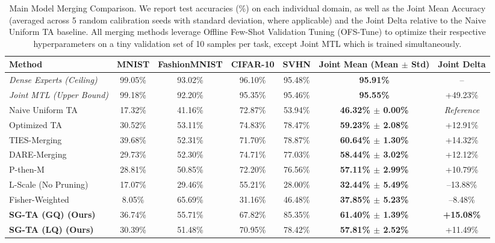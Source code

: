 \begin{table}[t]
\caption{Main Model Merging Comparison. We report test accuracies (\%) on each individual domain, as well as the Joint Mean Accuracy (averaged across 5 random calibration seeds with standard deviation, where applicable) and the Joint Delta relative to the Naive Uniform TA baseline. All merging methods leverage Offline Few-Shot Validation Tuning (OFS-Tune) to optimize their respective hyperparameters on a tiny validation set of 10 samples per task, except Joint MTL which is trained simultaneously.}
\label{tab:main_results}
\vskip 0.15in
\begin{center}
\begin{small}
\begin{sc}
\setlength{\tabcolsep}{4.5pt}
\begin{tabular}{lcccccc}
\toprule
Method & MNIST & FashionMNIST & CIFAR-10 & SVHN & Joint Mean (Mean $\pm$ Std) & Joint Delta \\
\midrule
\emph{Dense Experts (Ceiling)} & 99.05\% & 93.02\% & 96.10\% & 95.48\% & \textbf{95.91\%} & -- \\
\emph{Joint MTL (Upper Bound)} & 99.18\% & 92.20\% & 95.35\% & 95.46\% & \textbf{95.55\%} & +49.23\% \\
\midrule
Naive Uniform TA & 17.32\% & 41.16\% & 72.87\% & 53.94\% & \textbf{46.32\% $\pm$ 0.00\%} & \emph{Reference} \\
Optimized TA     & 30.52\% & 53.11\% & 74.83\% & 78.47\% & \textbf{59.23\% $\pm$ 2.08\%} & +12.91\% \\
TIES-Merging     & 39.68\% & 52.31\% & 71.70\% & 78.87\% & \textbf{60.64\% $\pm$ 1.30\%}  & +14.32\% \\
DARE-Merging     & 29.73\% & 52.30\% & 74.71\% & 77.03\% & \textbf{58.44\% $\pm$ 3.02\%}  & +12.12\% \\
P-then-M         & 28.81\% & 50.85\% & 72.20\% & 76.56\% & \textbf{57.11\% $\pm$ 2.99\%}  & +10.79\% \\
L-Scale (No Pruning) & 17.07\% & 29.46\% & 55.21\% & 28.00\% & \textbf{32.44\% $\pm$ 5.49\%}  & --13.88\% \\
Fisher-Weighted  & 8.05\% & 65.69\% & 31.16\% & 46.48\% & \textbf{37.85\% $\pm$ 5.23\%} & --8.48\% \\
\midrule
\textbf{SG-TA (GQ) (Ours)} & 36.74\% & 55.71\% & 67.82\% & 85.35\% & \textbf{61.40\% $\pm$ 1.39\%} & \textbf{+15.08\%} \\
\textbf{SG-TA (LQ) (Ours)} & 30.39\% & 51.48\% & 70.95\% & 78.42\% & \textbf{57.81\% $\pm$ 2.52\%}  & +11.49\% \\

\end{tabular}
\end{sc}
\end{small}
\end{center}
\end{table}
